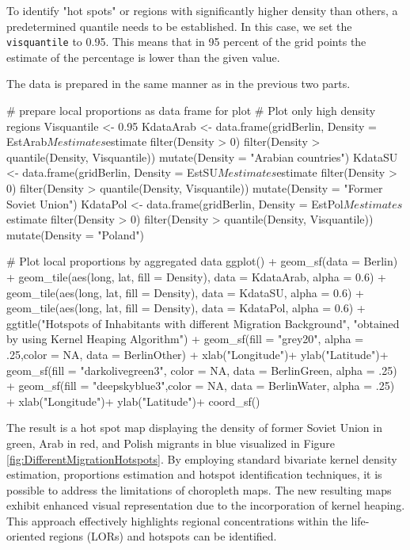 To identify "hot spots" or regions with significantly higher density than others, a predetermined quantile needs to be established. In this case, we set the \texttt{visquantile} to 0.95. This means that in 95 percent of the grid points the estimate of the percentage is lower than the given value. 

The data is prepared in the same manner as in the previous two parts. 

\begin{example}
    # prepare local proportions as data frame for plot
    # Plot only high density regions
    Visquantile <- 0.95
    KdataArab <- 
        data.frame(gridBerlin, Density = EstArab$Mestimates$estimate %
            filter(Density > 0) %
            filter(Density > quantile(Density, Visquantile)) %
            mutate(Density = "Arabian countries")
    KdataSU <- 
        data.frame(gridBerlin, Density = EstSU$Mestimates$estimate %
            filter(Density > 0) %
            filter(Density > quantile(Density, Visquantile)) %
            mutate(Density = "Former Soviet Union")
    KdataPol <- 
        data.frame(gridBerlin, Density = EstPol$Mestimates$estimate %
            filter(Density > 0) %
            filter(Density > quantile(Density, Visquantile)) %
            mutate(Density = "Poland")
    
    # Plot local proportions by aggregated data
    ggplot() +
      geom_sf(data = Berlin) +
      geom_tile(aes(long, lat, fill = Density), data = KdataArab, alpha = 0.6) + 
      geom_tile(aes(long, lat, fill = Density), data = KdataSU, alpha = 0.6) + 
      geom_tile(aes(long, lat, fill = Density), data = KdataPol, alpha = 0.6) +
      ggtitle("Hotspots of Inhabitants with different Migration Background", 
              "obtained by using Kernel Heaping Algorithm") +
      geom_sf(fill = "grey20", alpha = .25,color = NA,
              data = BerlinOther) +
      xlab("Longitude")+ ylab("Latitude")+
      geom_sf(fill = "darkolivegreen3", color = NA,
              data = BerlinGreen, alpha = .25) +
      geom_sf(fill = "deepskyblue3",color = NA,
              data = BerlinWater, alpha = .25) +
      xlab("Longitude")+ ylab("Latitude")+
    coord_sf()
\end{example}
The result is a hot spot map displaying the density of former Soviet Union in green, Arab in red, and Polish migrants in blue visualized in Figure \ref{fig:DifferentMigrationHotspots}.
By employing standard bivariate kernel density estimation, proportions estimation and hotspot identification techniques, it is possible to address the limitations of choropleth maps. The new resulting maps exhibit enhanced visual representation due to the incorporation of kernel heaping. This approach effectively highlights regional concentrations within the life-oriented regions (LORs) and hotspots can be identified. 

